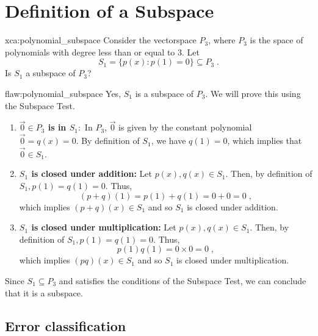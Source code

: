 \section{Definition of a Subspace}

\begin{xca}{xca:polynomial_subspace}
Consider the vectorspace $P_3$, where $P_3$ is the space of polynomials with degree less than or equal to $3.$ Let $$S_1 = \{p(x) : p(1) = 0\} \subseteq P_3 \;.$$ Is $S_1$ a subspace of $P_3$?


\end{xca}

\begin{flaw}{flaw:polynomial_subspace} %
Yes, $S_1$ is a subspace of $P_3.$ We will prove this using the Subspace Test.

\begin{enumerate}
    \item \textbf{$\vec{0} \in P_3$ is in $S_1:$} In $P_3$, $\vec{0}$ is given by the constant polynomial $\vec{0} = q(x) = 0.$ By definition of $S_1$, we have $q(1) = 0$, which implies that $\vec{0} \in S_1.$
    \item \textbf{$S_1$ is closed under addition:} Let $p(x), q(x) \in S_1.$ Then, by definition of $S_1, p(1) = q(1) = 0.$ Thus,
    $$(p+q)(1) = p(1) + q(1) = 0 + 0 = 0\;,$$
    which implies $(p+q)(x) \in S_1$ and so $S_1$ is closed under addition.
    \item \textbf{$S_1$ is closed under multiplication:} Let $p(x), q(x) \in S_1.$ Then, by definition of $S_1, p(1) = q(1) = 0.$ Thus,
    $$p(1)q(1)=0\times 0 =0 \;,$$
    which implies $(pq)(x) \in S_1$ and so $S_1$ is closed under multiplication.
\end{enumerate}
Since $S_1 \subseteq P_3$ and satisfies the conditions of the Subspace Test, we can conclude that it is a subspace.
\end{flaw}

\clearpage
\subsection{Error classification}

